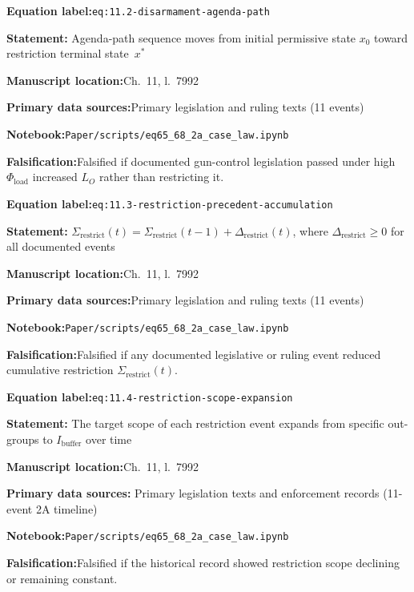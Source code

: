 \documentclass[12pt]{article}
\newcommand{\TierOne}{\textcolor{green!60!black}{\textbf{T1}}}
\newcommand{\caserow}[2]{%
  \noindent\textbf{#1:}\enspace #2\par\smallskip}
\begin{document}
\begin{tcolorbox}[caseblock, title={%
  \TierOne\quad Disarmament Agenda Path (\texttt{eq:11.2})}]

\caserow{Equation label}{\texttt{eq:11.2-disarmament-agenda-path}}
\caserow{Statement}{%
  Agenda-path sequence moves from initial permissive state
  $x_0$ toward restriction terminal state~$x^*$}
\caserow{Manuscript location}{Ch.~11, l.~7992}
\caserow{Primary data sources}{Primary legislation and ruling
  texts (11 events)}
\caserow{Notebook}{\texttt{Paper/scripts/eq65\_68\_2a\_case\_law.ipynb}}
\caserow{Falsification}{Falsified if documented gun-control
  legislation passed under high $\Phi_{\text{load}}$ increased
  $L_O$ rather than restricting it.}

\end{tcolorbox}

\begin{tcolorbox}[caseblock, title={%
  \TierOne\quad Restriction Precedent Accumulation (\texttt{eq:11.3})}]

\caserow{Equation label}{\texttt{eq:11.3-restriction-precedent-accumulation}}
\caserow{Statement}{%
  $\Sigma_{\text{restrict}}(t) = \Sigma_{\text{restrict}}(t-1)
   + \Delta_{\text{restrict}}(t)$, where
   $\Delta_{\text{restrict}} \geq 0$ for all documented events}
\caserow{Manuscript location}{Ch.~11, l.~7992}
\caserow{Primary data sources}{Primary legislation and ruling
  texts (11 events)}
\caserow{Notebook}{\texttt{Paper/scripts/eq65\_68\_2a\_case\_law.ipynb}}
\caserow{Falsification}{Falsified if any documented legislative or
  ruling event reduced cumulative restriction
  $\Sigma_{\text{restrict}}(t)$.}

\end{tcolorbox}

\begin{tcolorbox}[caseblock, title={%
  \TierOne\quad Restriction Scope Expansion (\texttt{eq:11.4})}]

\caserow{Equation label}{\texttt{eq:11.4-restriction-scope-expansion}}
\caserow{Statement}{%
  The target scope of each restriction event expands from
  specific out-groups to $I_{\text{buffer}}$ over time}
\caserow{Manuscript location}{Ch.~11, l.~7992}
\caserow{Primary data sources}{%
  Primary legislation texts and enforcement records
  (11-event 2A timeline)}
\caserow{Notebook}{\texttt{Paper/scripts/eq65\_68\_2a\_case\_law.ipynb}}
\caserow{Falsification}{Falsified if the historical record showed
  restriction scope declining or remaining constant.}

\end{tcolorbox}
\end{document}
